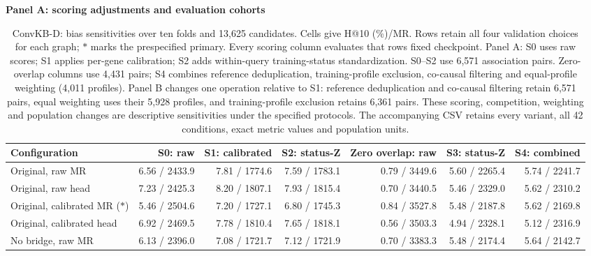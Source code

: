\begin{landscape}
\begin{table}[p]
\centering\footnotesize
\setlength{\tabcolsep}{3pt}
\caption{ConvKB-D: bias sensitivities over ten folds and 13,625 candidates. Cells give H@10 (\%)/MR. Rows retain all four validation choices for each graph; $\ast$ marks the prespecified primary. Every scoring column evaluates that row\textquotesingle s fixed checkpoint. Panel A: S0 uses raw scores; S1 applies per-gene calibration; S2 adds within-query training-status standardization. S0--S2 use 6,571 association pairs. Zero-overlap columns use 4,431 pairs; S4 combines reference deduplication, training-profile exclusion, co-causal filtering and equal-profile weighting (4,011 profiles). Panel B changes one operation relative to S1: reference deduplication and co-causal filtering retain 6,571 pairs, equal weighting uses their 5,928 profiles, and training-profile exclusion retains 6,361 pairs. These scoring, competition, weighting and population changes are descriptive sensitivities under the specified protocols. The accompanying CSV retains every variant, all 42 conditions, exact metric values and population units.}
\label{tab:matched_bias_CONVKB}
\textbf{Panel A: scoring adjustments and evaluation cohorts}\par\smallskip
\begin{adjustbox}{max width=\linewidth}
\begin{tabular}{lrrrrrr}
\toprule
Configuration & S0: raw & S1: calibrated & S2: status-Z & Zero overlap: raw & S3: status-Z & S4: combined \\
\midrule
Original, raw MR & 6.56 / 2433.9 & 7.81 / 1774.6 & 7.59 / 1783.1 & 0.79 / 3449.6 & 5.60 / 2265.4 & 5.74 / 2241.7 \\
Original, raw head & 7.23 / 2425.3 & 8.20 / 1807.1 & 7.93 / 1815.4 & 0.70 / 3440.5 & 5.46 / 2329.0 & 5.62 / 2310.2 \\
Original, calibrated MR ($\ast$) & 5.46 / 2504.6 & 7.20 / 1727.1 & 6.80 / 1745.3 & 0.84 / 3527.8 & 5.48 / 2187.8 & 5.62 / 2169.8 \\
Original, calibrated head & 6.92 / 2469.5 & 7.78 / 1810.4 & 7.65 / 1818.1 & 0.56 / 3503.3 & 4.94 / 2328.1 & 5.12 / 2316.9 \\
No bridge, raw MR & 6.13 / 2396.0 & 7.08 / 1721.7 & 7.12 / 1721.9 & 0.70 / 3383.3 & 5.48 / 2174.4 & 5.64 / 2142.7 \\

\end{tabular}
\end{adjustbox}
\end{table}
\end{landscape}

